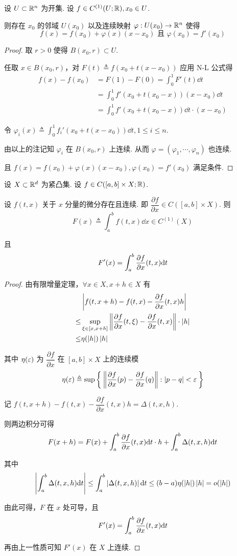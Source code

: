 \begin{property}
    设 $U\subset\mathbb{R}^n$ 为开集. 设 $f\in C^{(1)}(U;\mathbb{R}),x_0\in U$.

    则存在 $x_0$ 的邻域 $U(x_0)$ 以及连续映射 $\varphi:U(x_0)\to\mathbb{R}^n$ 使得
$$
f(x)=f(x_0)+\varphi(x)(x-x_0)\text{ 且 }\varphi(x_0)=f'(x_0)
$$
\end{property}
\begin{proof}
    取 $r>0$ 使得 $B(x_0,r)\subset U$.

    任取 $x\in B(x_0,r)$，对 $F(t)\triangleq f(x_0+t(x-x_0))$ 应用 N-L 公式得
$$
\begin{aligned}
    f(x)-f(x_0)&=F(1)-F(0)=\int_0^1F'(t)\dd t\\
    &=\int_0^1f'(x_0+t(x_0-x))(x-x_0)\dd t\\
    &=\int_0^1f'(x_0+t(x_0-x))\dd t\cdot(x-x_0)
\end{aligned}
$$

    令 $\varphi_i(x)\triangleq\displaystyle\int_0^1f_i'(x_0+t(x-x_0))\dd t,1\le i\le n$.

    由以上的注记知 $\varphi_i$ 在 $B(x_0,r)$ 上连续. 从而 $\varphi=(\varphi_1,\cdots,\varphi_n)$ 也连续.

    且 $f(x)=f(x_0)+\varphi(x)(x-x_0),\varphi(x_0)=f'(x_0)$ 满足条件.
\end{proof}


\begin{property}
    设 $X\subset\mathbb{R}^d$ 为紧凸集. 设 $f\in C([a,b]\times X;\mathbb{R})$.

    设 $f(t,x)$ 关于 $x$ 分量的微分存在且连续. 即 $\dfrac{\partial f}{\partial x}\in C([a,b]\times X)$. 则
$$
F(x)\triangleq\int_a^bf(t,x)\dd x\in C^{(1)}(X)
$$

    且
$$
F'(x)=\int_a^b\frac{\partial{f}}{\partial{x}}(t,x)\mathrm{d} t
$$
\end{property}
\begin{proof}
    由有限增量定理，$\forall x\in X,x+h\in X$ 有
$$
\begin{aligned}
    &\left\lvert{f(t,x+h)-f(t,x)-\frac{\partial{f}}{\partial{x}}(t,x)h}\right\rvert\\
    \le&\sup_{\xi\in[x,x+h]}\left\lVert{\frac{\partial{f}}{\partial{x}}(t,\xi)-\frac{\partial{f}}{\partial{x}}(t,x)}\right\rVert\cdot\left\lvert{h}\right\rvert\\
    \le&\eta(\left\lvert{h}\right\rvert)\left\lvert{h}\right\rvert
\end{aligned}
$$

    其中 $\eta(\varepsilon)$ 为 $\dfrac{\partial f}{\partial x}$ 在 $[a,b]\times X$ 上的连续模
$$
\eta(\varepsilon)\triangleq\sup\Set{\left\lVert{\frac{\partial{f}}{\partial{x}}(p)-\frac{\partial{f}}{\partial{x}}(q)}\right\rVert:\left\lvert{p-q}\right\rvert<\varepsilon}
$$

    记 $f(t,x+h)-f(t,x)-\dfrac{\partial f}{\partial x}(t,x)h=\Delta(t,x,h)$.

    则两边积分可得
$$
F(x+h)=F(x)+\int_a^b\frac{\partial{f}}{\partial{x}}(t,x)\mathrm{d} t\cdot h+\int_a^b\Delta(t,x,h)\mathrm{d} t
$$

    其中
$$
\left\lvert{\int_a^b\Delta(t,x,h)\mathrm{d}t}\right\rvert\le\int_a^b\left\lvert{\Delta(t,x,h)}\right\rvert\mathrm{d} t\le(b-a)\eta(\left\lvert{h}\right\rvert)\left\lvert{h}\right\rvert=o(\left\lvert{h}\right\rvert)
$$

    由此可得，$F$ 在 $x$ 处可导，且
$$
F'(x)=\int_a^b\frac{\partial{f}}{\partial{x}}(t,x)\mathrm{d} t
$$

    再由上一性质可知 $F'(x)$ 在 $X$ 上连续.
\end{proof}

